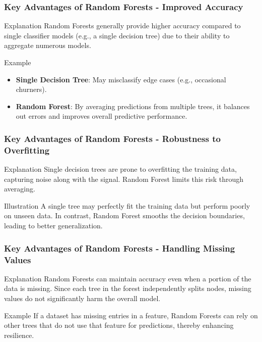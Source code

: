 \documentclass[aspectratio=169]{beamer}
\begin{document}
\begin{frame}[fragile]
    \frametitle{Key Advantages of Random Forests - Improved Accuracy}
    \begin{block}{Explanation}
        Random Forests generally provide higher accuracy compared to single classifier models (e.g., a single decision tree) due to their ability to aggregate numerous models.
    \end{block}
    \begin{block}{Example}
        \begin{itemize}
            \item \textbf{Single Decision Tree}: May misclassify edge cases (e.g., occasional churners).
            \item \textbf{Random Forest}: By averaging predictions from multiple trees, it balances out errors and improves overall predictive performance.
        \end{itemize}
    \end{block}
\end{frame}

\begin{frame}[fragile]
    \frametitle{Key Advantages of Random Forests - Robustness to Overfitting}
    \begin{block}{Explanation}
        Single decision trees are prone to overfitting the training data, capturing noise along with the signal. 
        Random Forest limits this risk through averaging.
    \end{block}
    \begin{block}{Illustration}
        A single tree may perfectly fit the training data but perform poorly on unseen data. 
        In contrast, Random Forest smooths the decision boundaries, leading to better generalization.
    \end{block}
\end{frame}

\begin{frame}[fragile]
    \frametitle{Key Advantages of Random Forests - Handling Missing Values}
    \begin{block}{Explanation}
        Random Forests can maintain accuracy even when a portion of the data is missing. 
        Since each tree in the forest independently splits nodes, missing values do not significantly harm the overall model.
    \end{block}
    \begin{block}{Example}
        If a dataset has missing entries in a feature, Random Forests can rely on other trees that do not use that feature for predictions, thereby enhancing resilience.
    \end{block}
\end{frame}
\end{document}
